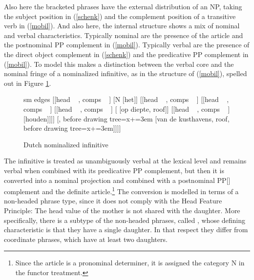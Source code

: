 \documentclass[output=paper]{langsci/langscibook}
\begin{document}
\noindent
Also here the bracketed phrases have the external distribution of an NP, 
taking the subject position in (\ref{schenk}) and 
the complement position of a transitive verb in (\ref{mobil}). 
And also here, the internal structure shows a mix of nominal and verbal
characteristics. 
Typically nominal are the presence of the article and the postnominal PP
complement in (\ref{mobil}). 
Typically verbal are the presence of the direct object complement in (\ref{schenk})
and the predicative PP complement in (\ref{mobil}). 
To model this \citet{VanEynde19} makes a distinction between the verbal core 
and the nominal fringe of a nominalized infinitive, as in the structure of 
(\ref{mobil}), spelled out in Figure \ref{kust}.  

\begin{figure}
	\centering
	\begin{forest}
sm edges
[{[{\sc head} ~  , {\sc comps} ~ \eliste]}
	[N [het]]
	[{[{\sc head} ~ , {\sc comps} ~ \eliste]}
		[{[{\sc head} ~ , {\sc comps} ~ ]}
			[{[{\sc head} ~  , {\sc comps} ~ ]}
			[ [op diepte, roof]]
			[{[{\sc head} ~ , {\sc comps} ~ ]} [houden]]]]
		[, before drawing tree={x+=3em} [van de kusthavens, roof, before drawing tree={x+=3em}]]]]
	\end{forest}
	\caption{\label{kust} Dutch nominalized infinitive}
\end{figure}   

The infinitive is treated as unambiguously verbal at the lexical level and 
remains verbal when combined with its predicative PP complement, but then it  
is converted into a nominal projection and combined with a postnominal PP[]
complement and the definite article.\footnote{Since the article is a pronominal 
determiner, it is assigned the category N in the functor treatment.}     
The conversion is modelled in terms of a non-headed phrase type, 
since it does not comply with the Head Feature Principle: 
The {\sc head} value of the mother is not shared with the daughter.  
More specifically, there is a subtype of the non-headed phrases, called , 
whose defining characteristic is that they have a single daughter. 
In that respect they differ from coordinate phrases, which have at least two daughters.  

\begin{exe} 
\ex\label{conv} 
\begin{avm} 
\end{avm}
\end{exe}
\end{document}
